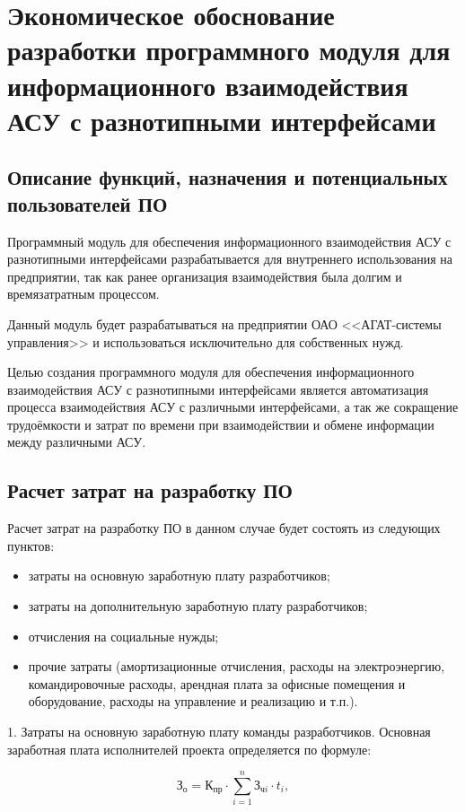 \section{Экономическое обоснование разработки программного модуля для информационного взаимодействия АСУ с разнотипными интерфейсами}
\label{sec:economics}

\subsection{Описание функций, назначения и потенциальных пользователей ПО}

Программный модуль для обеспечения информационного взаимодействия АСУ с разнотипными интерфейсами разрабатывается для внутреннего использования на предприятии, так как ранее организация взаимодействия была долгим и времязатратным процессом.

Данный модуль будет разрабатываться на предприятии ОАО <<АГАТ-системы управления>> и использоваться исключительно для собственных нужд.

Целью создания программного модуля для обеспечения информационного взаимодействия АСУ с разнотипными интерфейсами является автоматизация процесса взаимодействия АСУ с различными интерфейсами, а так же сокращение трудоёмкости и затрат по времени при взаимодействии и обмене информации между различными АСУ.

\subsection{Расчет затрат на разработку ПО}
Расчет затрат на разработку ПО в данном случае будет состоять из следующих пунктов:
\begin{itemize}
    \item затраты на основную заработную плату разработчиков;
    \item затраты на дополнительную заработную плату разработчиков;
    \item отчисления на социальные нужды;
    \item прочие затраты (амортизационные отчисления, расходы на электроэнергию, командировочные расходы, арендная плата за офисные помещения и оборудование, расходы на управление и реализацию и т.п.).
\end{itemize}

1. Затраты на основную заработную плату команды разработчиков.
Основная заработная плата исполнителей проекта определяется по формуле:

\begin{equation}
    \mbox{З}_{\mbox{о}}=\mbox{К}_{\mbox{пр}}\cdot \sum_{i=1}^{n}{\mbox{З}_{\mbox{ч}i}\cdot t_{i}},
\end{equation}


